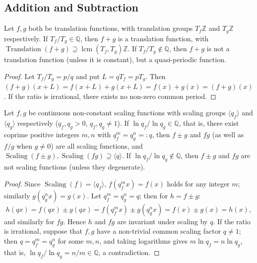 \subsection{Addition and Subtraction}

\begin{proposition}\label{prop:add_translation}
Let $f, g$ both be translation functions, with translation groups $T_f\mathbb{Z}$ and $T_g\mathbb{Z}$ respectively. If $T_f/T_g \in \mathbb{Q}$, then $f+g$ is a translation function, with $\operatorname{Translation}(f+g) \supseteq \operatorname{lcm}(T_f, T_g)\mathbb{Z}$. If $T_f/T_g \notin \mathbb{Q}$, then $f+g$ is not a translation function (unless it is constant), but a quasi-periodic function.
\end{proposition}

\begin{proof}
Let $T_f/T_g = p/q$ and put $L = qT_f = pT_g$. Then $(f+g)(x+L) = f(x+L) + g(x+L) = f(x) + g(x) = (f+g)(x)$. If the ratio is irrational, there exists no non-zero common period.
\end{proof}

\begin{proposition}\label{ch8_add_scaling}
Let $f,g$ be continuous non-constant scaling functions with scaling groups $\langle q_f\rangle$ and $\langle q_g\rangle$ respectively ($q_f,q_g>0$, $q_f,q_g\neq 1$). If $\ln q_f/\ln q_g\in\mathbb{Q}$, that is, there exist coprime positive integers $m,n$ with $q_f^m=q_g^n=:q$, then $f\pm g$ and $fg$ (as well as $f/g$ when $g\neq 0$) are all scaling functions, and $\operatorname{Scaling}(f\pm g),\operatorname{Scaling}(fg)\supseteq\langle q\rangle$. If $\ln q_f/\ln q_g\notin\mathbb{Q}$, then $f\pm g$ and $fg$ are not scaling functions (unless they degenerate).
\end{proposition}

\begin{proof}
Since $\operatorname{Scaling}(f)=\langle q_f\rangle$, $f(q_f^m x)=f(x)$ holds for any integer $m$; similarly $g(q_g^n x)=g(x)$. Let $q_f^m=q_g^n=q$; then for $h=f\pm g$:
\[
h(qx)=f(qx)\pm g(qx)=f(q_f^m x)\pm g(q_g^n x)=f(x)\pm g(x)=h(x),
\]
and similarly for $fg$. Hence $h$ and $fg$ are invariant under scaling by $q$. If the ratio is irrational, suppose that $f,g$ have a non-trivial common scaling factor $q\neq 1$; then $q=q_f^m=q_g^n$ for some $m,n$, and taking logarithms gives $m\ln q_f=n\ln q_g$, that is, $\ln q_f/\ln q_g=n/m\in\mathbb{Q}$, a contradiction.
\end{proof}

